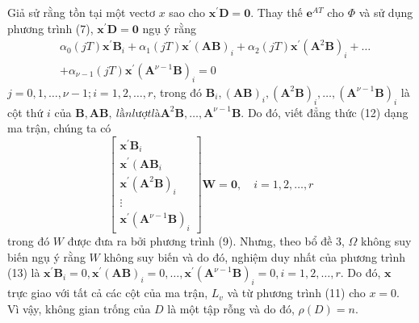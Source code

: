\documentclass[12pt,a4paper]{article}
\begin{document}
Giả sử rằng tồn tại một vectơ $x$ sao cho $\mathbf{x}^{\prime} \mathbf{D}=\mathbf{0}$. Thay thế $\mathbf{e}^{A T}$ cho $\Phi$ và sử dụng phương trình (7), $\mathbf{x}^{\prime} \mathbf{D}=\mathbf{0}$ ngụ ý rằng
\begin{equation}\label{pt12}\tag{12}
	\begin{aligned}
		& \alpha_0(j T) \mathbf{x}^{\prime} \mathbf{B}_i+\alpha_1(j T) \mathbf{x}^{\prime}(\mathbf{A B})_i+\alpha_2(j T) \mathbf{x}^{\prime}\left(\mathbf{A}^2 \mathbf{B}\right)_i+\ldots \\
		&+\alpha_{\nu-1}(j T) \mathbf{x}^{\prime}\left(\mathbf{A}^{\nu-1} \mathbf{B}\right)_i=0
	\end{aligned}
\end{equation}
$j=0,1, \ldots, \nu-1 ; i=1,2, \ldots, r$, trong đó $\mathbf{B}_i,(\mathbf{A B})_i,\left(\mathbf{A}^2 \mathbf{B}\right)_i, \ldots,\left(\mathbf{A}^{\nu-1} \mathbf{B}\right)_i$ là cột thứ $i$ của $\mathbf{B}, \mathbf{A B}, \ lần lượt là \mathbf{A}^2 \mathbf{B}, \ldots, \mathbf{A}^{\nu-1} \mathbf{B}$. Do đó, viết đẳng thức (12) dạng ma trận, chúng ta có
\begin{equation}\tag{13}\label{pt13}
	\left[\begin{array}{c}
		\mathbf{x}^{\prime} \mathbf{B}_i \\
		\mathbf{x}^{\prime}\left(\mathbf{A} \mathbf{B}_i\right. \\
		\mathbf{x}^{\prime}\left(\mathbf{A}^2 \mathbf{B}\right)_i \\
		\vdots \\
		\mathbf{x}^{\prime}\left(\mathbf{A}^{\nu-1} \mathbf{B}\right)_i
	\end{array}\right] \mathbf{W}=\mathbf{0}, \quad i=1,2, \ldots, r
\end{equation}
trong đó $W$ được đưa ra bởi phương trình (9). Nhưng, theo bổ đề 3, $\Omega$ không suy biến ngụ ý rằng $W$ không suy biến và do đó,  nghiệm duy nhất của phương trình (13) là $\mathbf{x}^{\prime} \mathbf{B}_i=0,
 \mathbf{x}^{\prime}(\mathbf{A B})_i=0, \ldots, \mathbf {x}^{\prime}\left(\mathbf{A}^{\nu-1} \mathbf{B}\right)_i=0, i=1,2, \ldots, r$. Do đó, $\mathbf{x}$ trực giao với tất cả các cột của ma trận, $L_v$ và  từ phương trình (11) cho $x=0$. Vì vậy, không gian trống của $D$ là một tập rỗng và do đó, $\rho(D)=n$.
\end{document}
